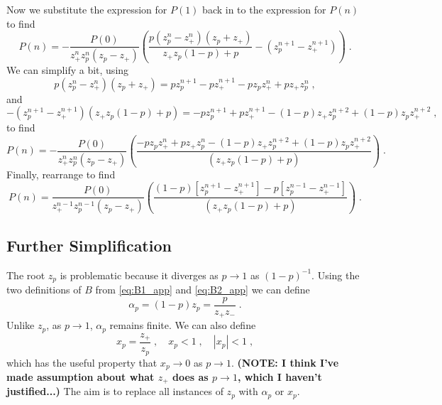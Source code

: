 \documentclass[a4paper,10pt]{article}
\begin{document}
Now we substitute the expression for $P(1)$ back in to the expression for $P(n)$ to find
\begin{equation}
  P(n) = -\frac{P(0)}{z_+^n z_p^n(z_p-z_+)} \left( \frac{p(z_p^n-z_+^n)(z_p+z_+)}{z_+z_p(1-p) + p} -(z_p^{n+1} -z_+^{n+1}) \right) \;. 
\end{equation}
We can simplify a bit, using
\begin{equation}
 p(z_p^n-z_+^n)(z_p+z_+) = pz_p^{n+1} - pz_+^{n+1} -pz_pz_+^n + pz_+z_p^n \;, 
\end{equation}
and 
\begin{equation}
 -(z_p^{n+1} -z_+^{n+1}) (z_+z_p(1-p) + p) = -pz_p^{n+1} + pz_+^{n+1} - (1-p) z_+z_p^{n+2} + (1-p)z_pz_+^{n+2} \;,
\end{equation}
to find
\begin{equation}
  P(n) = -\frac{P(0)}{z_+^n z_p^n(z_p-z_+)} \left( \frac{-pz_pz_+^n + pz_+z_p^n - (1-p) z_+z_p^{n+2} + (1-p)z_pz_+^{n+2}}{(z_+z_p(1-p) + p)} \right) \;. 
\end{equation}
Finally, rearrange to find
\begin{equation}\label{eq:gen_soln_1_app}
  P(n) = \frac{P(0)}{z_+^{n-1} z_p^{n-1}(z_p-z_+)} \left( \frac{ (1-p) [z_p^{n+1} - z_+^{n+1}] - p[  z_p^{n-1} - z_+^{n-1}]}{(z_+z_p(1-p) + p)} \right) \;. 
\end{equation}

\subsection{Further Simplification}

The root $z_p$ is problematic because it diverges as $p\to1$ as $(1-p)^{-1}$. Using the two definitions of $B$ from \eqref{eq:B1_app} and \eqref{eq:B2_app} we can define
\begin{equation}\label{eq:alpha_p_defn_app}
  \alpha_p = (1-p)z_p = \frac{p}{z_+z_-} \;.
\end{equation}
Unlike $z_p$, as $p\to 1$, $\alpha_p$ remains finite. We can also define
\begin{equation}
  x_p = \frac{z_+}{z_p} \;, \quad x_p < 1 \;, \quad |x_p| < 1 \;, 
\end{equation}
which has the useful property that $x_p \to 0$ as $p\to 1$. {\bf (NOTE: I think I've made assumption about what $z_+$ does as $p\to 1$, which I haven't justified...)} The aim is to replace all instances of $z_p$ with $\alpha_p$ or $x_p$.
\end{document}
